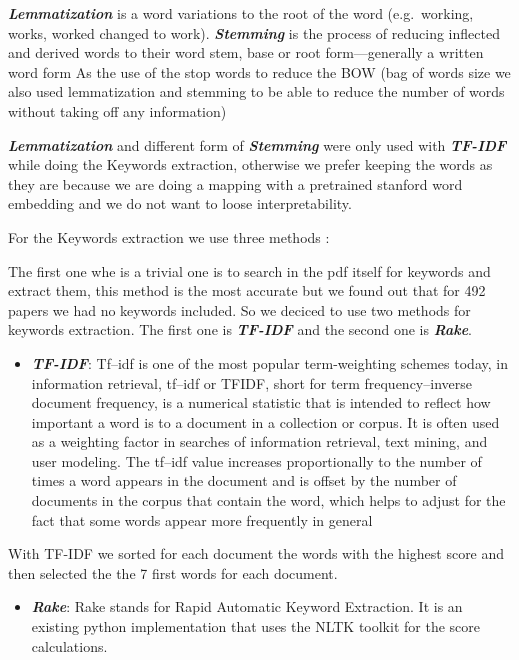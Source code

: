 \documentclass[article,twocolumn]{IEEEtran}
\providecommand{\tightlist}{%
      \setlength{\itemsep}{0pt}\setlength{\parskip}{0pt}}
\begin{document}
\textbf{\emph{Lemmatization}} is a word variations to the root of the
word (e.g.~working, works, worked changed to work).
\textbf{\emph{Stemming}} is the process of reducing inflected and
derived words to their word stem, base or root form---generally a
written word form As the use of the stop words to reduce the BOW (bag of
words size we also used lemmatization and stemming to be able to reduce
the number of words without taking off any information)

    \textbf{\emph{Lemmatization}} and different form of
\textbf{\emph{Stemming}} were only used with \textbf{\emph{TF-IDF}}
while doing the Keywords extraction, otherwise we prefer keeping the
words as they are because we are doing a mapping with a pretrained
stanford word embedding and we do not want to loose interpretability.

    For the Keywords extraction we use three methods :

The first one whe is a trivial one is to search in the pdf itself for
keywords and extract them, this method is the most accurate but we found
out that for 492 papers we had no keywords included. So we deciced to
use two methods for keywords extraction. The first one is
\textbf{\emph{TF-IDF}} and the second one is \textbf{\emph{Rake}}.

    \begin{itemize}
\tightlist
\item
  \textbf{\emph{TF-IDF}}: Tf--idf is one of the most popular
  term-weighting schemes today, in information retrieval, tf--idf or
  TFIDF, short for term frequency--inverse document frequency, is a
  numerical statistic that is intended to reflect how important a word
  is to a document in a collection or corpus. It is often used as a
  weighting factor in searches of information retrieval, text mining,
  and user modeling. The tf--idf value increases proportionally to the
  number of times a word appears in the document and is offset by the
  number of documents in the corpus that contain the word, which helps
  to adjust for the fact that some words appear more frequently in
  general \cite{Tf-idf}
\end{itemize}

    With TF-IDF we sorted for each document the words with the highest score
and then selected the the 7 first words for each document.

    \begin{itemize}
\tightlist
\item
  \textbf{\emph{Rake}}: Rake stands for Rapid Automatic Keyword
  Extraction. It is an existing python implementation that uses the NLTK
  toolkit for the score calculations.
\end{itemize}
\end{document}
